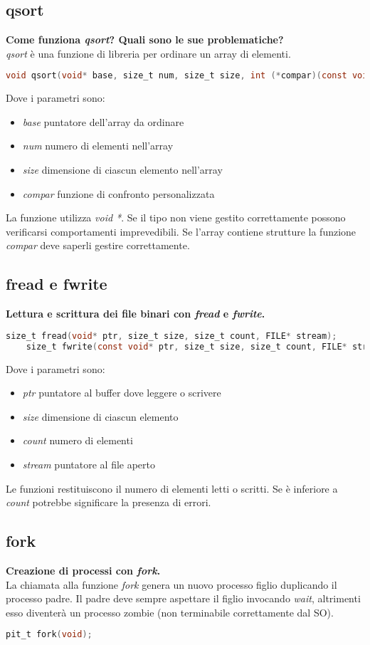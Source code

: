\documentclass[a4paper,10pt]{article}
\theoremstyle{remark}
\theoremstyle{definition}
\theoremstyle{plain}
\theoremstyle{definition}
\theoremstyle{definition}
\theoremstyle{definition}
\theoremstyle{plain}
\theoremstyle{plain}
\begin{document}
\subsection{qsort}
\textbf{Come funziona \textit{qsort}? Quali sono le sue problematiche?}\\
\textit{qsort} è una funzione di libreria per ordinare un array di elementi.
\begin{lstlisting}[language=C]
	void qsort(void* base, size_t num, size_t size, int (*compar)(const void*, const void*));
\end{lstlisting}
Dove i parametri sono:
\begin{itemize}
	\item \textit{base} puntatore dell'array da ordinare
	\item \textit{num} numero di elementi nell'array
	\item \textit{size} dimensione di ciascun elemento nell'array
	\item \textit{compar} funzione di confronto personalizzata
\end{itemize}
La funzione utilizza \textit{void *}. Se il tipo non viene gestito correttamente possono verificarsi comportamenti imprevedibili. Se l'array contiene strutture la funzione \textit{compar} deve saperli gestire correttamente.
\subsection{fread e fwrite}
\textbf{Lettura e scrittura dei file binari con \textit{fread} e \textit{fwrite}.}\\
\begin{lstlisting}[language=C]
	size_t fread(void* ptr, size_t size, size_t count, FILE* stream);
	size_t fwrite(const void* ptr, size_t size, size_t count, FILE* stream);
\end{lstlisting}
Dove i parametri sono:
\begin{itemize}
	\item \textit{ptr} puntatore al buffer dove leggere o scrivere
	\item \textit{size} dimensione di ciascun elemento
	\item \textit{count} numero di elementi
	\item \textit{stream} puntatore al file aperto
\end{itemize}
Le funzioni restituiscono il numero di elementi letti o scritti. Se è inferiore a \textit{count} potrebbe significare la presenza di errori.
\subsection{fork}
\textbf{Creazione di processi con \textit{fork}.}\\
La chiamata alla funzione \textit{fork} genera un nuovo processo figlio duplicando il processo padre. Il padre deve sempre aspettare il figlio invocando \textit{wait}, altrimenti esso diventerà un processo zombie (non terminabile correttamente dal SO).
\begin{lstlisting}[language=C]
	pit_t fork(void);
\end{lstlisting}
\end{document}
